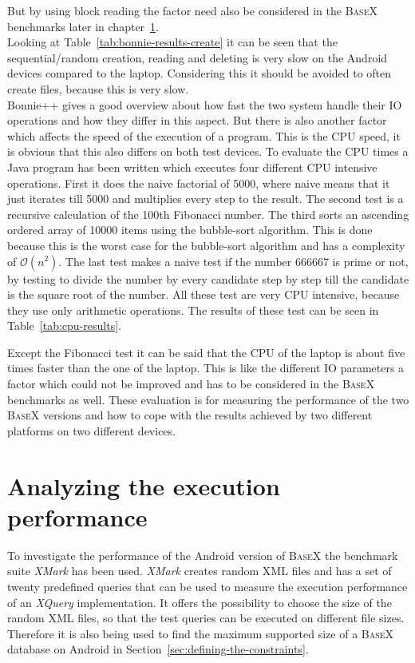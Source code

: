But by using block reading the factor need also be considered in the \textsc{BaseX} benchmarks later in chapter~\ref{sec:analysing-the-execution-performance}.
\\
Looking at Table~\ref{tab:bonnie-results-create} it can be seen that the sequential/random creation, reading and deleting is very slow on the Android devices compared to the laptop.
Considering this it should be avoided to often create files, because this is very slow.\\
Bonnie++ gives a good overview about how fast the two system handle their IO operations and how they differ in this aspect.
But there is also another factor which affects the speed of the execution of a program.
This is the CPU speed, it is obvious that this also differs on both test devices.
To evaluate the CPU times a Java program has been written which executes four different CPU intensive operations.
First it does the naive factorial of 5000, where naive means that it just iterates till 5000 and multiplies every step to the result.
The second test is a recursive calculation of the 100th Fibonacci number.
The third sorts an ascending ordered array of 10000 items using the bubble-sort algorithm.
This is done because this is the worst case for the bubble-sort algorithm and has a complexity of $\mathcal O(n^2)$.
The last test makes a naive test if the number 666667 is prime or not, by testing to divide the number by every candidate step by step till the candidate is the square root of the number.
All these test are very CPU intensive, because they use only arithmetic operations.
The results of these test can be seen in Table~\ref{tab:cpu-results}.

Except the Fibonacci test it can be said that the CPU of the laptop is about five times faster than the one of the laptop.
This is like the different IO parameters a factor which could not be improved and has to be considered in the \textsc{BaseX} benchmarks as well.
These evaluation is for measuring the performance of the two \textsc{BaseX} versions and how to cope with the results achieved by two different platforms on two different devices.


\section{Analyzing the execution performance}
\label{sec:analysing-the-execution-performance}
To investigate the performance of the Android version of \textsc{BaseX} the benchmark suite \textit{XMark} has been used.
\textit{XMark} creates random XML files and has a set of twenty predefined queries that can be used to measure the execution performance of an \textit{XQuery} implementation.
It offers the possibility to choose the size of the random XML files, so that the test queries can be executed on different file sizes.
Therefore it is also being used to find the maximum supported size of a \textsc{BaseX} database on Android in Section~\ref{sec:defining-the-constraints}.


